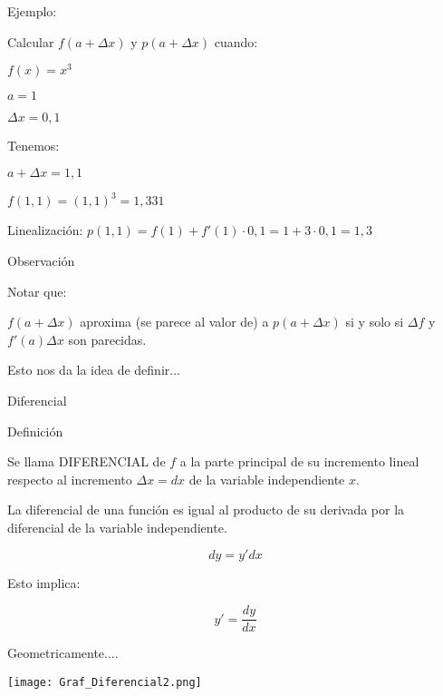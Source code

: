 \documentclass[utf8x]{beamer}
\begin{document}


\begin{frame}{Ejemplo:}

Calcular $f(a+\Delta x)$ y $p(a+\Delta x)$ cuando:

$f(x) = x^3$

$a= 1$

$\Delta x = 0,1$

Tenemos:

$a+\Delta x = 1,1$

$f(1,1)=(1,1)^3=1,331$

Linealización:
$p(1,1)=f(1)+f'(1)\cdot 0,1=1+3\cdot 0,1=1,3$

\end{frame}

\begin{frame}{Observación}

\begin{block}{Notar que:}

 $f(a+\Delta x)$ aproxima (se parece al valor de) a  $p(a+\Delta x)$ si y solo si 
 $\Delta f$ y $f'(a)\Delta x $ son parecidas.

\end{block}

Esto nos da la idea de definir...
\end{frame}


\begin{frame}{Diferencial}

\begin{block}{Definición}


Se llama DIFERENCIAL de $f$ a la parte principal de su incremento lineal respecto al incremento $\Delta x = dx $ de la variable independiente $x$.


La diferencial de una función es igual al producto de su derivada por la diferencial de la variable independiente.


$$ dy = y' dx $$


Esto implica:

$$  y'   = \frac{dy}{dx} $$


\end{block}

\end{frame}


\begin{frame}{Geometricamente....}

\begin{center}
\texttt{[image: Graf\_Diferencial2.png]}
\end{center}


\end{frame}
\end{document}
